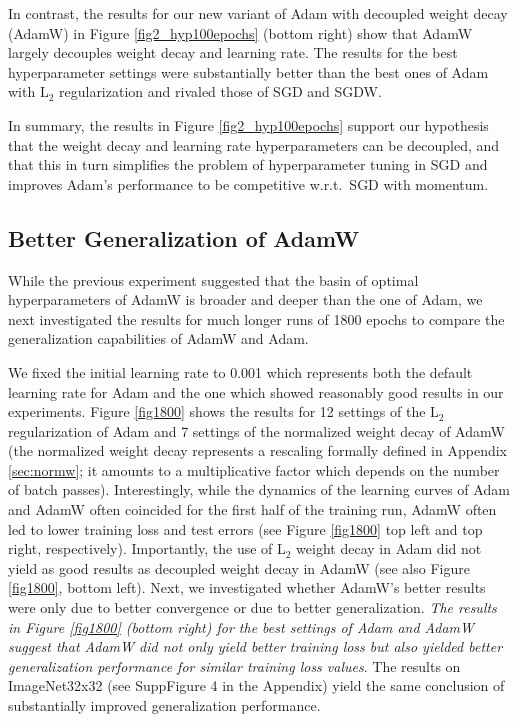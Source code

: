 \documentclass[usenames,dvipsnames]{article} %
\begin{document}
In contrast, the results for our new variant of Adam with decoupled weight decay (AdamW) in Figure \ref{fig2_hyp100epochs} (bottom right) show that AdamW largely decouples weight decay and learning rate. The results for the best hyperparameter settings were substantially better than the best ones of Adam with L$_2$ regularization and rivaled those of SGD and SGDW. 

In summary, the results in Figure \ref{fig2_hyp100epochs} support our hypothesis that the weight decay and learning rate hyperparameters can be decoupled, and that this in turn simplifies the problem of hyperparameter tuning in SGD and improves Adam's performance to be competitive w.r.t.\ SGD with momentum. 


\subsection{Better Generalization of AdamW}\label{sec:exp_generalization}

While the previous experiment 
suggested that the basin of optimal hyperparameters of AdamW is broader and deeper than the one of Adam, we next investigated the results for much longer runs of 1800 epochs to compare the generalization capabilities of AdamW and Adam.

We fixed the initial learning rate to 0.001 which represents both the default learning rate for Adam and the one which showed reasonably good results in our experiments. 
Figure \ref{fig1800} shows the results for 12 settings of the L$_2$ regularization of Adam and 7 settings of the normalized weight decay of AdamW (the normalized weight decay represents a rescaling formally defined in Appendix \ref{sec:normw}; it amounts to a multiplicative factor which depends on the number of batch passes). 
Interestingly, while the dynamics of the learning curves of Adam and AdamW often coincided for the first half of the training run, AdamW often led to lower training loss and test errors (see Figure \ref{fig1800} top left and top right, respectively). 
Importantly, the use of L$_2$ weight decay in Adam did not yield as good results as decoupled weight decay in AdamW (see also Figure \ref{fig1800}, bottom left).
Next, we investigated whether AdamW's better results were only due to better convergence or due to better generalization. 
\emph{The results in Figure \ref{fig1800} (bottom right) for the best settings of Adam and AdamW suggest that AdamW did not only yield better training loss but 
also yielded better generalization performance for similar training loss values}.
The results on ImageNet32x32 (see SuppFigure 4
in the Appendix) yield the same conclusion of substantially improved generalization performance. 
\end{document}
